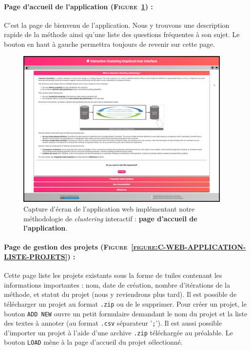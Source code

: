 	
	\newpage
	\paragraph{Page d'accueil de l'application (\textsc{Figure~\ref{figure:C-WEB-APPLICATION-ACCUEIL}}) :}
		C'est la page de bienvenu de l'application.
		Nous y trouvons une description rapide de la méthode ainsi qu'une liste des questions fréquentes à son sujet.
		Le bouton en haut à gauche permettra toujours de revenir sur cette page.
		
		\begin{figure}[H]
			\centering
			\includegraphics[width=0.95\textwidth]{figures/interactive-clustering-application-accueil-application}
			\caption{
				Capture d'écran de l'application web implémentant notre méthodologie de \textit{clustering} interactif : \textbf{page d'accueil de l'application}.
			}
			\label{figure:C-WEB-APPLICATION-ACCUEIL}
		\end{figure}
	
	
	\newpage
	\paragraph{Page de gestion des projets (\textsc{Figure~\ref{figure:C-WEB-APPLICATION-LISTE-PROJETS}}) :}
		Cette page liste les projets existants sous la forme de tuiles contenant les informations importantes : nom, date de création, nombre d'itérations de la méthode, et statut du projet (nous y reviendrons plus tard).
		Il est possible de télécharger un projet au format \texttt{.zip} ou de le supprimer.
		Pour créer un projet, le bouton \texttt{ADD NEW} ouvre un petit formulaire demandant le nom du projet et la liste des textes à annoter (au format \texttt{.csv} séparateur '\texttt{;}').
		Il est aussi possible d'importer un projet à l'aide d'une archive \texttt{.zip} téléchargée au préalable.
		Le bouton \texttt{LOAD} mène à la page d'accueil du projet sélectionné.
		
